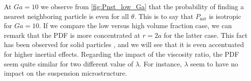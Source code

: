 At $Ga = 10$ we observe from \ref{fig:Pnst_low_Ga} that the probability of finding a nearest neighboring particle is even for all $\theta$. 
This is to say that $P_\text{nst}$ is isotropic for $Ga=10$.
If we compare the low versus high volume fraction case, we can remark that the PDF is more concentrated at $r = 2a$ for the latter case. 
This fact has been observed for solid particles \cite{guazzelli2011}, and we will see that it is even accentuated for higher inertial effects. 
Regarding the impact of the viscosity ratio, the PDF seem quite similar for two different value of $\lambda$. 
For instance, $\lambda$ seem to have no impact on the suspension microstructure. 

